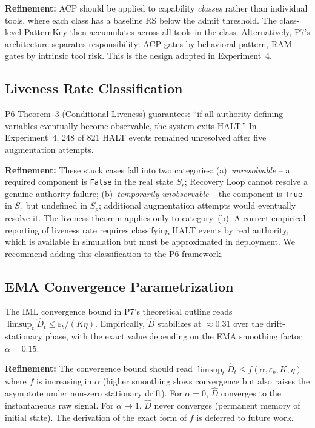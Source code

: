 \documentclass[11pt]{article}
\newcommand{\Dhat}{\widehat{D}}
\newcommand{\Sp}{S_p}
\newcommand{\Sr}{S_r}
\begin{document}
\textbf{Refinement:} ACP should be applied to capability \emph{classes}
rather than individual tools, where each class has a baseline RS below
the admit threshold. The class-level PatternKey then accumulates across
all tools in the class. Alternatively, P7's architecture separates
responsibility: ACP gates by behavioral pattern, RAM gates by intrinsic
tool risk. This is the design adopted in Experiment~4.

\subsection{Liveness Rate Classification}

P6 Theorem~3 (Conditional Liveness) guarantees: ``if all authority-defining
variables eventually become observable, the system exits HALT.''
In Experiment~4, 248 of 821 HALT events remained unresolved after five
augmentation attempts.

\textbf{Refinement:} These stuck cases fall into two categories:
(a)~\emph{unresolvable} -- a required component is \texttt{False} in the real
state $\Sr$; Recovery Loop cannot resolve a genuine authority failure;
(b)~\emph{temporarily unobservable} -- the component is \texttt{True} in $\Sr$
but undefined in $\Sp$; additional augmentation attempts would eventually resolve it.
The liveness theorem applies only to category~(b). A correct empirical
reporting of liveness rate requires classifying HALT events by real authority,
which is available in simulation but must be approximated in deployment.
We recommend adding this classification to the P6 framework.

\subsection{EMA Convergence Parametrization}

The IML convergence bound in P7's theoretical outline reads
$\limsup_{t} \Dhat_t \leq \varepsilon_b / (K\eta)$.
Empirically, $\Dhat$ stabilizes at $\approx 0.31$ over the drift-stationary
phase, with the exact value depending on the EMA smoothing factor $\alpha = 0.15$.

\textbf{Refinement:} The convergence bound should read
$\limsup_t \Dhat_t \leq f(\alpha, \varepsilon_b, K, \eta)$
where $f$ is increasing in $\alpha$ (higher smoothing slows convergence
but also raises the asymptote under non-zero stationary drift).
For $\alpha = 0$, $\Dhat$ converges to the instantaneous raw signal.
For $\alpha \to 1$, $\Dhat$ never converges (permanent memory of initial state).
The derivation of the exact form of $f$ is deferred to future work.
\end{document}

